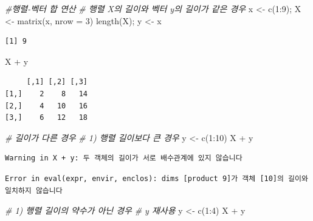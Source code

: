 \documentclass[
  11pt,
]{krantz}
\newenvironment{Shaded}{\begin{snugshade}}{\end{snugshade}}
\newcommand{\AttributeTok}[1]{\textcolor[rgb]{0.61,0.61,0.61}{#1}}
\newcommand{\CommentTok}[1]{\textcolor[rgb]{0.37,0.37,0.37}{\textit{#1}}}
\newcommand{\DecValTok}[1]{\textcolor[rgb]{0.06,0.06,0.06}{#1}}
\newcommand{\FunctionTok}[1]{\textcolor[rgb]{0,0,0}{#1}}
\newcommand{\NormalTok}[1]{#1}
\newcommand{\OtherTok}[1]{\textcolor[rgb]{0.37,0.37,0.37}{#1}}
\newcommand{\SpecialCharTok}[1]{\textcolor[rgb]{0,0,0}{#1}}
\begin{document}
\footnotesize

\begin{Shaded}
\begin{Highlighting}[]
\CommentTok{\#행렬{-}벡터 합 연산}
\CommentTok{\# 행렬 X의 길이와 벡터 y의 길이가 같은 경우}
\NormalTok{x }\OtherTok{\textless{}{-}} \FunctionTok{c}\NormalTok{(}\DecValTok{1}\SpecialCharTok{:}\DecValTok{9}\NormalTok{); X }\OtherTok{\textless{}{-}} \FunctionTok{matrix}\NormalTok{(x, }\AttributeTok{nrow =} \DecValTok{3}\NormalTok{)}
\FunctionTok{length}\NormalTok{(X); y }\OtherTok{\textless{}{-}}\NormalTok{ x}
\end{Highlighting}
\end{Shaded}

\begin{verbatim}
[1] 9
\end{verbatim}

\begin{Shaded}
\begin{Highlighting}[]
\NormalTok{X }\SpecialCharTok{+}\NormalTok{ y}
\end{Highlighting}
\end{Shaded}

\begin{verbatim}
     [,1] [,2] [,3]
[1,]    2    8   14
[2,]    4   10   16
[3,]    6   12   18
\end{verbatim}

\begin{Shaded}
\begin{Highlighting}[]
\CommentTok{\# 길이가 다른 경우}
\CommentTok{\# 1) 행렬 길이보다 큰 경우}
\NormalTok{y }\OtherTok{\textless{}{-}} \FunctionTok{c}\NormalTok{(}\DecValTok{1}\SpecialCharTok{:}\DecValTok{10}\NormalTok{)}
\NormalTok{X }\SpecialCharTok{+}\NormalTok{ y}
\end{Highlighting}
\end{Shaded}

\begin{verbatim}
Warning in X + y: 두 객체의 길이가 서로 배수관계에 있지 않습니다
\end{verbatim}

\begin{verbatim}
Error in eval(expr, envir, enclos): dims [product 9]가 객체 [10]의 길이와 일치하지 않습니다
\end{verbatim}

\begin{Shaded}
\begin{Highlighting}[]
\CommentTok{\# 1) 행렬 길이의 약수가 아닌 경우}
\CommentTok{\# y 재사용}
\NormalTok{y }\OtherTok{\textless{}{-}} \FunctionTok{c}\NormalTok{(}\DecValTok{1}\SpecialCharTok{:}\DecValTok{4}\NormalTok{)}
\NormalTok{X }\SpecialCharTok{+}\NormalTok{ y}
\end{Highlighting}
\end{Shaded}
\end{document}
